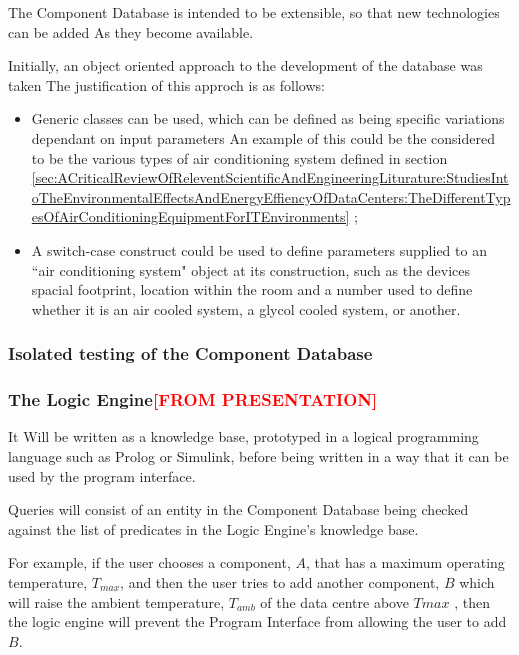 The Component Database is intended to be extensible, so that 
new technologies can be added As they become available.

Initially, an object oriented approach to the development of the database was taken
The justification of this approch is as follows:

\begin{itemize}

\item Generic classes can be used, which can be defined as being specific variations
 dependant on input parameters An example of this could be the considered to be the various
types of air conditioning system defined in section \ref{sec:ACriticalReviewOfReleventScientificAndEngineeringLiturature:StudiesIntoTheEnvironmentalEffectsAndEnergyEffiencyOfDataCenters:TheDifferentTypesOfAirConditioningEquipmentForITEnvironments}
\cite{TonyEvansTheDifferentTypesOfAirConditioningEquipmentForITEnvironmentsWhitePaper};

\item A switch-case construct could be used to define parameters supplied to an ``air conditioning system"
object at its construction, such as the devices spacial footprint, location within the room and a number 
used to define whether it is an air cooled system, a glycol cooled system, or another.

\end{itemize}

\subsubsection{Isolated testing of the Component Database}

\subsubsection{The Logic Engine\textcolor{red}{[FROM PRESENTATION]}}
\label{sec:Methodology:TechnicalOverview:TheLogicEngine}
It Will be written as a knowledge base, prototyped in a logical programming language such as Prolog or Simulink, before being written in a way that it can be used by the program interface.

Queries will consist of an entity in the Component Database being checked against the list of predicates in the Logic Engine's knowledge base. 

For example, if the user chooses a component, $A$, that has a maximum operating temperature, $T_{max}$, and then the user tries to add another component, $B$ which will raise the ambient temperature, $T_{amb}$ of the data centre above $T{max}$ , then the logic engine will prevent the Program Interface from allowing the user to add $B$.

